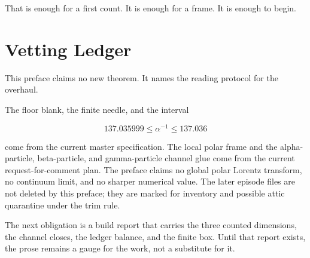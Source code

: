That is enough for a first count. It is enough for a frame. It is enough
to begin.

\section*{Vetting Ledger}

This preface claims no new theorem. It names the reading protocol for
the overhaul.

The floor blank, the finite needle, and the interval

\[
137.035999 \leq \alpha^{-1} \leq 137.036
\]

come from the current master specification. The local polar frame and
the alpha-particle, beta-particle, and gamma-particle channel glue come
from the current request-for-comment plan. The preface claims no global
polar Lorentz transform, no continuum limit, and no sharper numerical
value. The later episode files are not deleted by this preface; they are
marked for inventory and possible attic quarantine under the trim rule.

The next obligation is a build report that carries the three counted
dimensions, the channel closes, the ledger balance, and the finite box.
Until that report exists, the prose remains a gauge for the work, not a
substitute for it.

